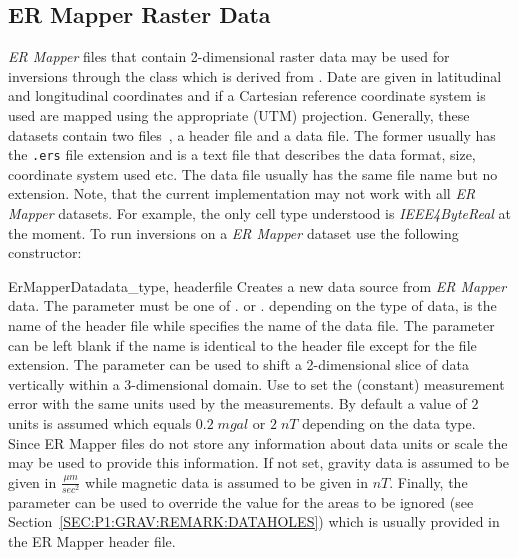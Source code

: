 \subsection{ER Mapper Raster Data}\label{sec:ref:DataSource:ERM}
\emph{ER Mapper} files that contain 2-dimensional raster data may be used for
inversions through the  class which is derived from
. Date are given in latitudinal and longitudinal coordinates and if
a Cartesian reference coordinate system is used are mapped using the appropriate  (UTM) projection. 
Generally, these datasets contain two files~\cite{ERMAPPER}, a header file and a data file.
The former usually has the \texttt{.ers} file extension and is a text file that
describes the data format, size, coordinate system used etc.
The data file usually has the same file name but no extension.
Note, that the current implementation may not work with all \emph{ER Mapper}
datasets. For example, the only cell type understood is \emph{IEEE4ByteReal}
at the moment.
To run inversions on a \emph{ER Mapper} dataset use the following constructor:
\begin{classdesc}{ErMapperData}{data_type, headerfile%
%
%
%
%
}
Creates a new data source from \emph{ER Mapper} data.
The parameter  must be one of
. or .
depending on the type of data,  is the name of the header
file while  specifies the name of the data file.
The parameter  can be left blank if the name is identical to
the header file except for the file extension.
The  parameter can be used to shift a 2-dimensional slice of
data vertically within a 3-dimensional domain.
Use  to set the (constant) measurement error with the same units
used by the measurements. By default a value of $2$ units is assumed which
equals $0.2 \; mgal$ or $2 \; nT$ depending on the data type.
Since ER Mapper files do not store any information about data units or scale
the  may be used to provide this information.
If not set, gravity data is assumed to be given in $\frac{\mu m}{sec^2}$ while
magnetic data is assumed to be given in $nT$.
Finally, the  parameter can be used to override the value
for the areas to be ignored (see Section~\ref{SEC:P1:GRAV:REMARK:DATAHOLES})
which is usually provided in the ER Mapper header file.
\end{classdesc}

